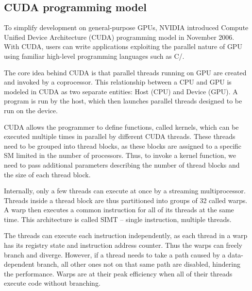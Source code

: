 \subsection{CUDA programming model}

To simplify development on general-purpose GPUs, NVIDIA introduced Compute Unified Device Architecture (CUDA) programming model in November 2006. With CUDA, users can write applications exploiting the parallel nature of GPU using familiar high-level programming languages such as C/\CC.

The core idea behind CUDA is that parallel threads running on GPU are created and invoked by a coprocessor. This relationship between a CPU and GPU is modeled in CUDA as two separate entities: Host (CPU) and Device (GPU). A program is run by the host, which then launches parallel threads designed to be run on the device.

CUDA allows the programmer to define functions, called kernels, which can be executed multiple times in parallel by different CUDA threads. These threads need to be grouped into thread blocks, as these blocks are assigned to a specific SM limited in the number of processors. Thus, to invoke a kernel function, we need to pass additional parameters describing the number of thread blocks and the size of each thread block.

Internally, only a few threads can execute at once by a streaming multiprocessor. Threads inside a thread block are thus partitioned into groups of 32 called warps. A warp then executes a common instruction for all of its threads at the same time. This architecture is called SIMT -- single instruction, multiple threads.

The threads can execute each instruction independently, as each thread in a warp has its registry state and instruction address counter. Thus the warps can freely branch and diverge. However, if a thread needs to take a path caused by a data-dependent branch, all other ones not on that same path are disabled, hindering the performance. Warps are at their peak efficiency when all of their threads execute code without branching.